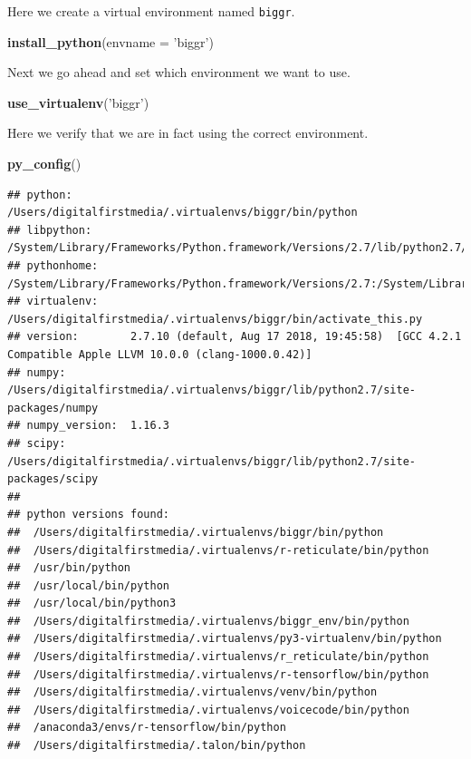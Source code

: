 \documentclass[]{book}
\newenvironment{Shaded}{\begin{snugshade}}{\end{snugshade}}
\newcommand{\DataTypeTok}[1]{\textcolor[rgb]{0.13,0.29,0.53}{#1}}
\newcommand{\KeywordTok}[1]{\textcolor[rgb]{0.13,0.29,0.53}{\textbf{#1}}}
\newcommand{\NormalTok}[1]{#1}
\newcommand{\StringTok}[1]{\textcolor[rgb]{0.31,0.60,0.02}{#1}}
\begin{document}
Here we create a virtual environment named \texttt{biggr}.

\begin{Shaded}
\begin{Highlighting}[]
\KeywordTok{install_python}\NormalTok{(}\DataTypeTok{envname =} \StringTok{'biggr'}\NormalTok{)}
\end{Highlighting}
\end{Shaded}

Next we go ahead and set which environment we want to use.

\begin{Shaded}
\begin{Highlighting}[]
\KeywordTok{use_virtualenv}\NormalTok{(}\StringTok{'biggr'}\NormalTok{)}
\end{Highlighting}
\end{Shaded}

Here we verify that we are in fact using the correct environment.

\begin{Shaded}
\begin{Highlighting}[]
\KeywordTok{py_config}\NormalTok{()}
\end{Highlighting}
\end{Shaded}

\begin{verbatim}
## python:         /Users/digitalfirstmedia/.virtualenvs/biggr/bin/python
## libpython:      /System/Library/Frameworks/Python.framework/Versions/2.7/lib/python2.7/config/libpython2.7.dylib
## pythonhome:     /System/Library/Frameworks/Python.framework/Versions/2.7:/System/Library/Frameworks/Python.framework/Versions/2.7
## virtualenv:     /Users/digitalfirstmedia/.virtualenvs/biggr/bin/activate_this.py
## version:        2.7.10 (default, Aug 17 2018, 19:45:58)  [GCC 4.2.1 Compatible Apple LLVM 10.0.0 (clang-1000.0.42)]
## numpy:          /Users/digitalfirstmedia/.virtualenvs/biggr/lib/python2.7/site-packages/numpy
## numpy_version:  1.16.3
## scipy:          /Users/digitalfirstmedia/.virtualenvs/biggr/lib/python2.7/site-packages/scipy
## 
## python versions found: 
##  /Users/digitalfirstmedia/.virtualenvs/biggr/bin/python
##  /Users/digitalfirstmedia/.virtualenvs/r-reticulate/bin/python
##  /usr/bin/python
##  /usr/local/bin/python
##  /usr/local/bin/python3
##  /Users/digitalfirstmedia/.virtualenvs/biggr_env/bin/python
##  /Users/digitalfirstmedia/.virtualenvs/py3-virtualenv/bin/python
##  /Users/digitalfirstmedia/.virtualenvs/r_reticulate/bin/python
##  /Users/digitalfirstmedia/.virtualenvs/r-tensorflow/bin/python
##  /Users/digitalfirstmedia/.virtualenvs/venv/bin/python
##  /Users/digitalfirstmedia/.virtualenvs/voicecode/bin/python
##  /anaconda3/envs/r-tensorflow/bin/python
##  /Users/digitalfirstmedia/.talon/bin/python
\end{verbatim}
\end{document}
